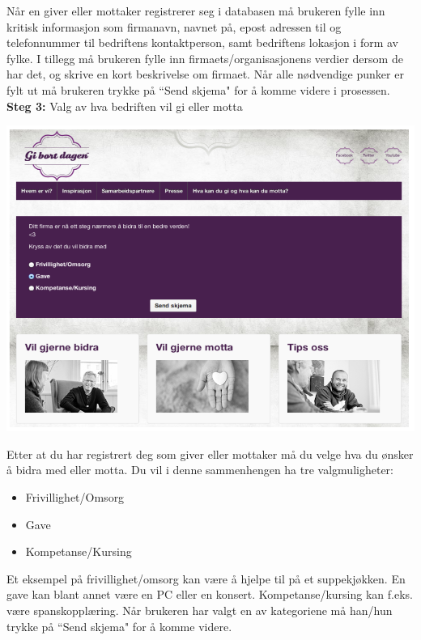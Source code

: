 Når en giver eller mottaker registrerer seg i databasen må brukeren fylle inn kritisk informasjon som firmanavn, navnet på, epost adressen til og telefonnummer til bedriftens kontaktperson, samt bedriftens lokasjon i form av fylke. I tillegg må brukeren fylle inn firmaets/organisasjonens verdier dersom de har det, og skrive en kort beskrivelse om firmaet. Når alle nødvendige punker er fylt ut må brukeren trykke på ``Send skjema" for å komme videre i prosessen.\\

{\bf Steg 3:} Valg av hva bedriften vil gi eller motta
\begin{center}
\includegraphics[clip=true, width=1 \textwidth,
trim=0cm 0cm 0cm 0cm]{valg1.png}
\label{fig:bidra}
\end{center}

Etter at du har registrert deg som giver eller mottaker må du velge hva du ønsker å bidra med eller motta. Du vil i denne sammenhengen ha tre valgmuligheter:\\

\begin{itemize}
    \item Frivillighet/Omsorg
    \item Gave
    \item Kompetanse/Kursing
\end{itemize}
Et eksempel på frivillighet/omsorg kan være å hjelpe til på et suppekjøkken. En gave kan blant annet være en PC eller en konsert. Kompetanse/kursing kan f.eks. være spanskopplæring. Når brukeren har valgt en av kategoriene må han/hun trykke på ``Send skjema" for å komme videre.\\


